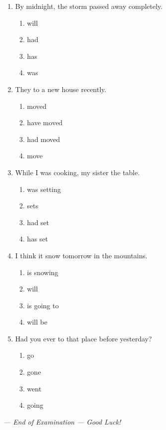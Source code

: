 \documentclass[11pt, a4paper]{article}
\begin{document}
\begin{enumerate}[leftmargin=1.8em, itemsep=10pt]
    \item By midnight, the storm \dotfill passed away completely.
    \begin{enumerate}[label=(\Alph*), itemsep=2pt]
        \item will
        \item had
        \item has
        \item was
    \end{enumerate}

    \item They \dotfill to a new house recently.
    \begin{enumerate}[label=(\Alph*), itemsep=2pt]
        \item moved
        \item have moved
        \item had moved
        \item move
    \end{enumerate}

    \item While I was cooking, my sister \dotfill the table.
    \begin{enumerate}[label=(\Alph*), itemsep=2pt]
        \item was setting
        \item sets
        \item had set
        \item has set
    \end{enumerate}

    \item I think it \dotfill snow tomorrow in the mountains.
    \begin{enumerate}[label=(\Alph*), itemsep=2pt]
        \item is snowing
        \item will
        \item is going to
        \item will be
    \end{enumerate}

    \item Had you ever \dotfill to that place before yesterday?
    \begin{enumerate}[label=(\Alph*), itemsep=2pt]
        \item go
        \item gone
        \item went
        \item going
    \end{enumerate}

\end{enumerate}

\vspace{1cm}

\begin{center}
    \textit{--- End of Examination --- Good Luck!}
\end{center}
\end{document}
